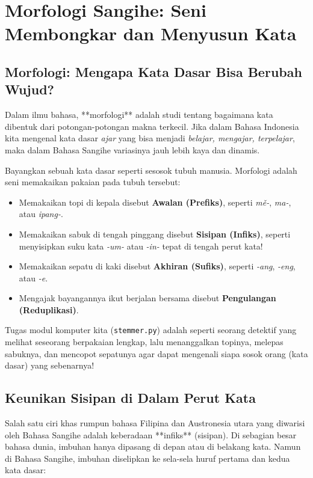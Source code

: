 \chapter{Morfologi Sangihe: Seni Membongkar dan Menyusun Kata}

\section{Morfologi: Mengapa Kata Dasar Bisa Berubah Wujud?}
Dalam ilmu bahasa, **morfologi** adalah studi tentang bagaimana kata dibentuk dari potongan-potongan makna terkecil. Jika dalam Bahasa Indonesia kita mengenal kata dasar \textit{ajar} yang bisa menjadi \textit{belajar, mengajar, terpelajar}, maka dalam Bahasa Sangihe variasinya jauh lebih kaya dan dinamis.

\begin{infobox}
Bayangkan sebuah kata dasar seperti sesosok tubuh manusia. Morfologi adalah seni memakaikan pakaian pada tubuh tersebut:
\begin{itemize}
    \item Memakaikan topi di kepala disebut \textbf{Awalan (Prefiks)}, seperti \textit{mě-}, \textit{ma-}, atau \textit{ipang-}.
    \item Memakaikan sabuk di tengah pinggang disebut \textbf{Sisipan (Infiks)}, seperti menyisipkan suku kata \textit{-um-} atau \textit{-in-} tepat di tengah perut kata!
    \item Memakaikan sepatu di kaki disebut \textbf{Akhiran (Sufiks)}, seperti \textit{-ang}, \textit{-eng}, atau \textit{-e}.
    \item Mengajak bayangannya ikut berjalan bersama disebut \textbf{Pengulangan (Reduplikasi)}.
\end{itemize}
Tugas modul komputer kita (\texttt{stemmer.py}) adalah seperti seorang detektif yang melihat seseorang berpakaian lengkap, lalu menanggalkan topinya, melepas sabuknya, dan mencopot sepatunya agar dapat mengenali siapa sosok orang (kata dasar) yang sebenarnya!
\end{infobox}

\section{Keunikan Sisipan di Dalam Perut Kata}
Salah satu ciri khas rumpun bahasa Filipina dan Austronesia utara yang diwarisi oleh Bahasa Sangihe adalah keberadaan **infiks** (sisipan). Di sebagian besar bahasa dunia, imbuhan hanya dipasang di depan atau di belakang kata. Namun di Bahasa Sangihe, imbuhan diselipkan ke sela-sela huruf pertama dan kedua kata dasar:

